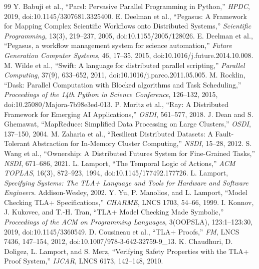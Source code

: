 \documentclass[11pt,a4paper]{article}
\begin{document}
\begin{thebibliography}{99}
 Y. Babuji et al., ``Parsl: Pervasive Parallel Programming in Python,''
\emph{HPDC}, 2019, doi:10.1145/3307681.3325400.
 E. Deelman et al., ``Pegasus: A Framework for Mapping Complex
Scientific Workflows onto Distributed Systems,'' \emph{Scientific Programming}, 13(3), 219--237,
2005, doi:10.1155/2005/128026.
 E. Deelman et al., ``Pegasus, a workflow management system for
science automation,'' \emph{Future Generation Computer Systems}, 46, 17--35, 2015,
doi:10.1016/j.future.2014.10.008.
 M. Wilde et al., ``Swift: A language for distributed parallel scripting,''
\emph{Parallel Computing}, 37(9), 633--652, 2011, doi:10.1016/j.parco.2011.05.005.
 M. Rocklin, ``Dask: Parallel Computation with Blocked algorithms and
Task Scheduling,'' \emph{Proceedings of the 14th Python in Science Conference}, 126--132, 2015,
doi:10.25080/Majora-7b98e3ed-013.
 P. Moritz et al., ``Ray: A Distributed Framework for Emerging AI
Applications,'' \emph{OSDI}, 561--577, 2018.
 J. Dean and S. Ghemawat, ``MapReduce: Simplified Data Processing on
Large Clusters,'' \emph{OSDI}, 137--150, 2004.
 M. Zaharia et al., ``Resilient Distributed Datasets: A Fault-Tolerant
Abstraction for In-Memory Cluster Computing,'' \emph{NSDI}, 15--28, 2012.
 S. Wang et al., ``Ownership: A Distributed Futures System for Fine-Grained
Tasks,'' \emph{NSDI}, 671--686, 2021.
 L. Lamport, ``The Temporal Logic of Actions,'' \emph{ACM TOPLAS}, 16(3),
872--923, 1994, doi:10.1145/177492.177726.
 L. Lamport, \emph{Specifying Systems: The TLA+ Language and Tools
for Hardware and Software Engineers}. Addison-Wesley, 2002.
 Y. Yu, P. Manolios, and L. Lamport, ``Model Checking TLA+
Specifications,'' \emph{CHARME}, LNCS 1703, 54--66, 1999.
 I. Konnov, J. Kukovec, and T.-H. Tran, ``TLA+ Model Checking Made
Symbolic,'' \emph{Proceedings of the ACM on Programming Languages}, 3(OOPSLA), 123:1--123:30,
2019, doi:10.1145/3360549.
 D. Cousineau et al., ``TLA+ Proofs,'' \emph{FM}, LNCS 7436, 147--154,
2012, doi:10.1007/978-3-642-32759-9\_13.
 K. Chaudhuri, D. Doligez, L. Lamport, and S. Merz, ``Verifying Safety
Properties with the TLA+ Proof System,'' \emph{IJCAR}, LNCS 6173, 142--148, 2010.

\end{thebibliography}
\end{document}
